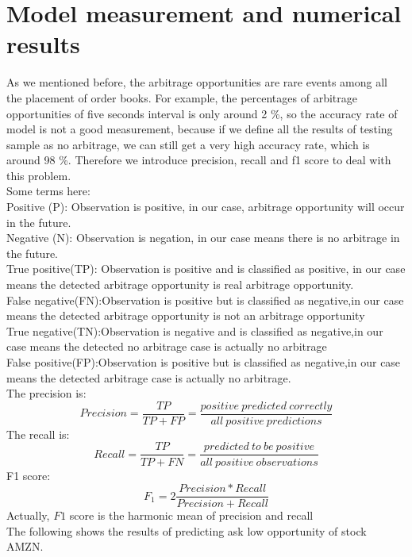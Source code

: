 \section{Model measurement and numerical results}
As we mentioned before, the arbitrage opportunities are rare events among all the placement of order books. For example, the percentages of arbitrage opportunities of five seconds interval is only around 2 \%, so the accuracy rate of model is not a good measurement, because if we define all the results of testing sample as no arbitrage, we can still get a very high accuracy rate, which is around 98 \%. Therefore we introduce precision, recall and f1 score to deal with this problem. \\
Some terms here:\\
Positive (P): Observation is positive, in our case, arbitrage opportunity will occur in the future.\\
Negative (N): Observation is negation, in our case means there is no arbitrage in the future. \\
True positive(TP): Observation is positive and is classified as positive, in our case means the detected arbitrage opportunity is real arbitrage opportunity.\\
False negative(FN):Observation is positive but is classified as negative,in our case means the detected arbitrage opportunity is not an arbitrage opportunity\\
True negative(TN):Observation is negative and is classified as negative,in our case means the detected no arbitrage case is actually no arbitrage\\
False positive(FP):Observation is positive but is classified as negative,in our case means the detected arbitrage case is actually no arbitrage. \\
The precision is: \\
\begin{equation}
Precision=\frac{TP}{TP+FP}=\frac{positive\ predicted\ correctly}{all\ positive\ predictions}
\end{equation} 
The recall is:\\
\begin{equation}
Recall=\frac{TP}{TP+FN}=\frac{predicted\ to\ be\ positive}{all\ positive\ observations}
\end{equation} 
F1 score:\\
\begin{equation}
F_1=2\frac{Precision*Recall}{Precision+Recall}
\end{equation} 
Actually, $F1$ score is the harmonic mean of precision and recall\\ 
The following shows the results of predicting ask low opportunity of stock AMZN.

